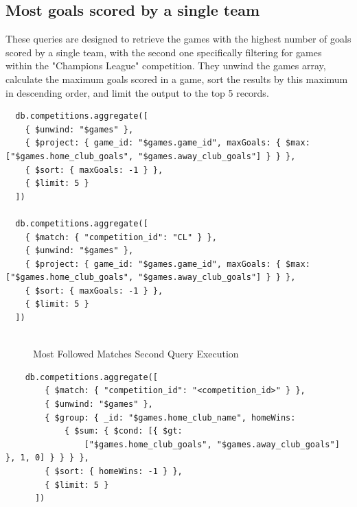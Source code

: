 \documentclass{Configuration_Files/PoliMi3i_thesis}
\begin{document}
\subsection{Most goals scored by a single team}
These queries are designed to retrieve the games with the highest number of goals scored by a single team, with the second one specifically filtering for games within the "Champions League" competition. They unwind the games array, calculate the maximum goals scored in a game, sort the results by this maximum in descending order, and limit the output to the top 5 records.
\begin{verbatim}
  db.competitions.aggregate([
    { $unwind: "$games" },
    { $project: { game_id: "$games.game_id", maxGoals: { $max: ["$games.home_club_goals", "$games.away_club_goals"] } } },
    { $sort: { maxGoals: -1 } },
    { $limit: 5 }
  ])

  db.competitions.aggregate([
    { $match: { "competition_id": "CL" } },
    { $unwind: "$games" },
    { $project: { game_id: "$games.game_id", maxGoals: { $max: ["$games.home_club_goals", "$games.away_club_goals"] } } },
    { $sort: { maxGoals: -1 } },
    { $limit: 5 }
  ])
  
\end{verbatim}
\begin{figure}[htbp]
    \centering
    \caption{Most Followed Matches Second Query Execution}
\end{figure}
\begin{verbatim}
    db.competitions.aggregate([
        { $match: { "competition_id": "<competition_id>" } },
        { $unwind: "$games" },
        { $group: { _id: "$games.home_club_name", homeWins: 
            { $sum: { $cond: [{ $gt: 
                ["$games.home_club_goals", "$games.away_club_goals"] }, 1, 0] } } } },
        { $sort: { homeWins: -1 } },
        { $limit: 5 }
      ]) 
\end{verbatim}
\end{document}
